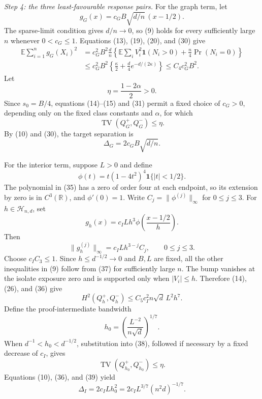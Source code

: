 \textit{Step 4: the three least-favourable response pairs.}
For the graph term, let
\[
 g_G(x)=c_GB\sqrt{d/n}\,(x-1/2).
\tag{30}
\]
The sparse-limit condition gives \(d/n\to0\), so (9) holds for every sufficiently large \(n\) whenever \(0<c_G\leq1\).  Equations (13), (19), (20), and (30) give
\[
 \begin{aligned}
 \mathbb E\sum_{i=1}^ng_G(X_i)^2
 &=c_G^2B^2\frac dn
 \left\{\mathbb E\sum_iV_i^2\mathbf1(N_i>0)
       +\frac n4\Pr(N_i=0)\right\}\\
 &\leq c_G^2B^2\left\{\frac\kappa2+\frac d4e^{-d/(2\kappa)}\right\}
 \leq C_4c_G^2B^2.
 \end{aligned}
\tag{31}
\]
Let
\[
 \eta=\frac{1-2\alpha}{2}>0.
\tag{32}
\]
Since \(s_0=B/4\), equations (14)--(15) and (31) permit a fixed choice of \(c_G>0\), depending only on the fixed class constants and \(\alpha\), for which
\[
 \operatorname{TV}(Q_G^+,Q_G^-)\leq\eta.
\tag{33}
\]
By (10) and (30), the target separation is
\[
 \Delta_G=2c_GB\sqrt{d/n}.
\tag{34}
\]

For the interior term, suppose \(L>0\) and define
\[
 \phi(t)=t(1-4t^2)^4\mathbf1\{|t|<1/2\}.
\tag{35}
\]
The polynomial in (35) has a zero of order four at each endpoint, so its extension by zero is in \(C^3(\mathbb R)\), and \(\phi'(0)=1\).  Write \(C_j=\|\phi^{(j)}\|_\infty\) for \(0\leq j\leq3\).  For \(h\in\mathcal H_{n,d}\), set
\[
 g_h(x)=c_ILh^3\phi\!\left(\frac{x-1/2}{h}\right).
\tag{36}
\]
Then
\[
 \|g_h^{(j)}\|_\infty=c_ILh^{3-j}C_j,
 \qquad 0\leq j\leq3.
\tag{37}
\]
Choose \(c_IC_3\leq1\).  Since \(h\leq d^{-1/2}\to0\) and \(B,L\) are fixed, all the other inequalities in (9) follow from (37) for sufficiently large \(n\).  The bump vanishes at the isolate exposure zero and is supported only when \(|V_i|\leq h\).  Therefore (14), (26), and (36) give
\[
 H^2(Q_h^+,Q_h^-)
 \leq C_5c_I^2n\sqrt d\,L^2h^7.
\tag{38}
\]
Define the proof-intermediate bandwidth
\[
 h_0=\left(\frac{L^{-2}}{n\sqrt d}\right)^{1/7}.
\tag{39}
\]
When \(d^{-1}<h_0<d^{-1/2}\), substitution into (38), followed if necessary by a fixed decrease of \(c_I\), gives
\[
 \operatorname{TV}(Q_{h_0}^+,Q_{h_0}^-)\leq\eta.
\tag{40}
\]
Equations (10), (36), and (39) yield
\[
 \Delta_I=2c_ILh_0^2
 =2c_IL^{3/7}(n^2d)^{-1/7}.
\tag{41}
\]


